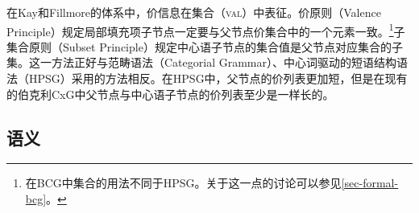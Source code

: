 在Kay和Fillmore的体系中，价信息在集合（\textsc{val}）中表征。价原则（Valence Principle）规定局部填充项子节点一定要与父节点价集合中的一个元素一致。\footnote{%
  在BCG中集合的用法不同于HPSG。关于这一点的讨论可以参见\ref{sec-formal-bcg}。%
}子集合原则（Subset Principle）规定中心语子节点的集合值是父节点对应集合的子集。这一方法正好与范畴语法\indexcgc（Categorial Grammar）、中心词驱动的短语结构语法\indexhpsgc（HPSG）采用的方法相反。在HPSG中，父节点的价列表更加短，但是在现有的伯克利CxG中父节点与中心语子节点的价列表至少是一样长的。

\subsection{语义}

